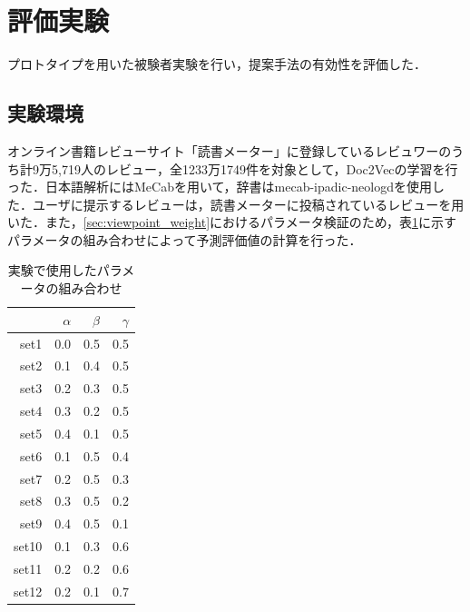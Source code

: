 \documentclass[a4paper,11pt,oneside,openany]{jsbook}
\begin{document}
	\section{評価実験}
プロトタイプを用いた被験者実験を行い，提案手法の有効性を評価した．
		\subsection{実験環境}
		
オンライン書籍レビューサイト「読書メーター」\cite{bookmeter}に登録しているレビュワーのうち計9万5,719人のレビュー，全1233万1749件を対象として，Doc2Vecの学習を行った．日本語解析にはMeCabを用いて，辞書はmecab-ipadic-neologd\cite{mecabdic}を使用した．ユーザに提示するレビューは，読書メーターに投稿されているレビューを用いた．また，\ref{sec:viewpoint_weight}におけるパラメータ検証のため，表\ref{table:parameter}に示すパラメータの組み合わせによって予測評価値の計算を行った．
\begin{table}[htb]
  \begin{center}
    \caption{実験で使用したパラメータの組み合わせ}
    \label{table:parameter} %
    \begin{tabular}{| r || r | r | r |} \hline
       & $\alpha$ & $\beta$ & $\gamma$ \\ \hline \hline
      set1 & 0.0 & 0.5 & 0.5 \\ \hline
      set2 & 0.1 & 0.4 & 0.5 \\ \hline
      set3 & 0.2 & 0.3 & 0.5 \\ \hline
      set4 & 0.3 & 0.2 & 0.5 \\ \hline
      set5 & 0.4 & 0.1 & 0.5 \\ \hline
      set6 & 0.1 & 0.5 & 0.4 \\ \hline
      set7 & 0.2 & 0.5 & 0.3 \\ \hline
      set8 & 0.3 & 0.5 & 0.2 \\ \hline
      set9 & 0.4 & 0.5 & 0.1 \\ \hline
      set10 & 0.1 & 0.3 & 0.6 \\ \hline
      set11 & 0.2 & 0.2& 0.6 \\ \hline
      set12 & 0.2 & 0.1& 0.7 \\ \hline
    \end{tabular}
  \end{center}
\end{table}
\end{document}
